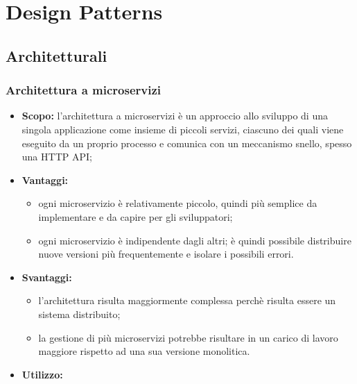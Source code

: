 \section{Design Patterns}
  \subsection{Architetturali}
    \subsubsection{Architettura a microservizi}
      \begin{itemize}
       \item \textbf{Scopo:} l'architettura a microservizi è un approccio allo sviluppo di una singola applicazione come insieme di piccoli servizi, ciascuno dei quali viene eseguito da un proprio processo e comunica con un meccanismo snello, spesso una HTTP API;
       \item \textbf{Vantaggi:}
	      \begin{itemize} 
	       \item ogni microservizio è relativamente piccolo, quindi più semplice da implementare e da capire per gli sviluppatori;
	       \item ogni microservizio è indipendente dagli altri; è quindi possibile distribuire nuove versioni più frequentemente e isolare i possibili errori.
	      \end{itemize}

       \item \textbf{Svantaggi:}
	\begin{itemize}
	 \item l'architettura risulta maggiormente complessa perchè risulta essere un sistema distribuito;
	 \item la gestione di più microservizi potrebbe risultare in un carico di lavoro maggiore rispetto ad una sua versione monolitica.
	\end{itemize}
       \item \textbf{Utilizzo:}
      \end{itemize}
      
